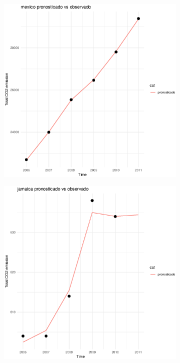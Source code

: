 \documentclass[twocolumn]{article}
\begin{document}
\begin{figure}
        \begin{subfigure}{.3\textwidth}
            \includegraphics[width=\linewidth]{images/mexico_imputation.eps}
        \end{subfigure}
        \hspace*{\fill}
        \begin{subfigure}{.3\textwidth}
            \includegraphics[width=\linewidth]{images/jamaica_imputation.eps}

\end{subfigure}
\end{figure}
\end{document}
